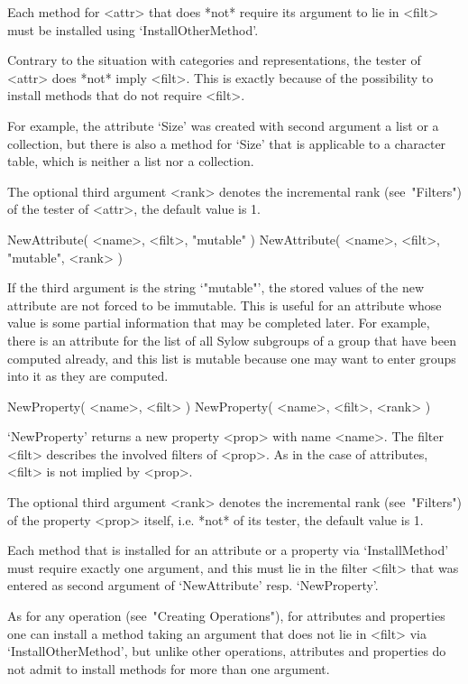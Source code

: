 Each method for <attr> that does *not* require its argument to lie
in <filt> must be installed using `InstallOtherMethod'.

Contrary to the situation with categories and representations,
the tester of <attr> does *not* imply <filt>.
This is exactly because of the possibility to install methods
that do not require <filt>.

For example, the attribute `Size' was created with second argument
a list or a collection,
but there is also a method for `Size' that is applicable to
a character table, which is neither a list nor a collection.

The optional third argument <rank> denotes the incremental rank
(see~"Filters") of the tester of <attr>, the default value is 1.

\>NewAttribute( <name>, <filt>, "mutable" )
\)NewAttribute( <name>, <filt>, "mutable", <rank> )

If the third argument is the string `"mutable"', the stored values of the
new attribute are not forced to be immutable.
This is useful for an attribute whose value is some partial information
that may be completed later.
For example, there is an attribute for the list of all Sylow subgroups
of a group that have been computed already,
and this list is mutable because one may want to enter groups into it
as they are computed.

\>NewProperty( <name>, <filt> )
\)NewProperty( <name>, <filt>, <rank> )

`NewProperty' returns a new property <prop> with name <name>.
The filter <filt> describes the involved filters of <prop>.
As in the case of attributes, <filt> is not implied by <prop>.

The optional third argument <rank> denotes the incremental rank
(see~"Filters") of the property <prop> itself, i.e. *not* of its tester,
the default value is 1.

Each method that is installed for an attribute or a property
via `InstallMethod' must require exactly one argument,
and this must lie in the filter <filt> that was entered as second
argument of `NewAttribute' resp. `NewProperty'.

As for any operation (see~"Creating Operations"),
for attributes and properties one can install a method taking an argument
that does not lie in <filt> via `InstallOtherMethod',
but unlike other operations, attributes and properties do not admit
to install methods for more than one argument.



